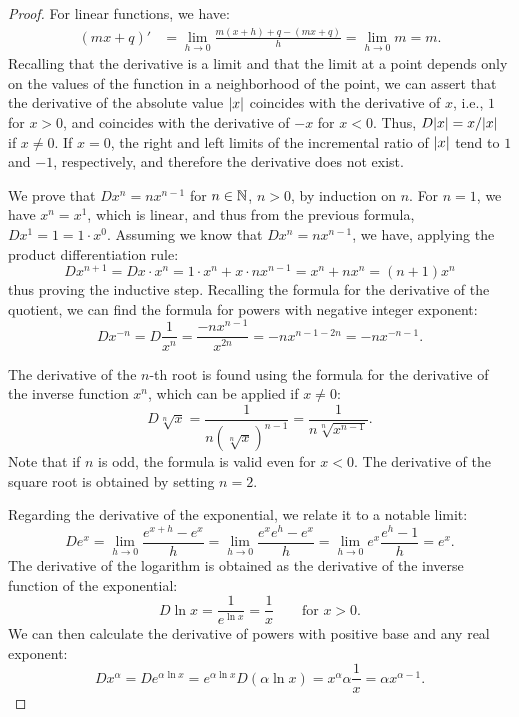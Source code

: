 \begin{proof}
\mymark{**}
For linear functions, we have:
\begin{align*}
(mx+q)' &= \lim_{h\to 0}\frac{m(x+h)+q - (mx+q)}{h} = \lim_{h\to 0} m = m.
\end{align*}
Recalling that the derivative is a limit and that the limit at a point depends 
only on the values of the function in a neighborhood of the point, 
we can assert that the derivative of the absolute value ${\left|x\right|}$ 
coincides with the derivative of $x$, i.e., $1$ for $x>0$, and coincides 
with the derivative of $-x$ for $x<0$. Thus, $D {\left|x\right|} = x / {\left|x\right|}$ 
if $x\neq 0$. 
If $x=0$, the right and left limits of the incremental ratio of ${\left|x\right|}$ 
tend to $1$ and $-1$, respectively, and therefore the derivative does not exist.

We prove that $Dx^n = n x^{n-1}$ for $n\in {\mathbb N}$, $n>0$, 
by induction on $n$. For $n=1$, we have $x^n=x^1$, which is linear, 
and thus from the previous formula, $Dx^1 = 1 = 1 \cdot x^0$. 
Assuming we know that $D x^n = n x^{n-1}$, we have, applying 
the product differentiation rule:
\[
  D x^{n+1} = D x\cdot x^n = 1 \cdot x^n + x \cdot n x^{n-1}
   = x^n + n x^n = (n+1) x^n
\]
thus proving the inductive step.
Recalling the formula for the derivative of the quotient,
we can find the formula for powers with negative integer exponent:
\[
  D x^{-n} = D \frac{1}{x^n} = \frac{-n x^{n-1}}{x^{2n}}
   = -n x^{n-1-2n} = -n x^{-n-1}.
\]

The derivative of the $n$-th root is found using the formula for the derivative
of the inverse function $x^n$, which can be applied if $x\neq 0$:
\[
  D \sqrt[n]{x} = \frac{1}{n(\sqrt[n]{x})^{n-1}}
    = \frac{1}{n\sqrt[n]{x^{n-1}}}.
\]
Note that if $n$ is odd, the formula is valid even for $x<0$.
The derivative of the square root is obtained by setting $n=2$.

Regarding the derivative of the exponential,
we relate it to a notable limit:
\[
  D e^x = \lim_{h\to 0} \frac{e^{x+h}-e^x}{h}
  = \lim_{h\to 0}\frac{e^x e^h - e^x}{h}
  = \lim_{h\to 0}e^x \frac{e^h - 1}{h}
  = e^x.
\]
The derivative of the logarithm is obtained as the derivative of the inverse
function of the exponential:
\[
  D \ln x = \frac{1}{e^{\ln x}} = \frac{1}{x} \qquad\text{for $x>0$}.
\]
We can then calculate the derivative of powers with positive base and any real
exponent:
\[
D x^\alpha
= D e^{\alpha \ln x}
= e^{\alpha \ln x} D(\alpha \ln x)
= x^\alpha \alpha \frac{1}{x}
= \alpha x^{\alpha -1}.
\]


\end{proof}
